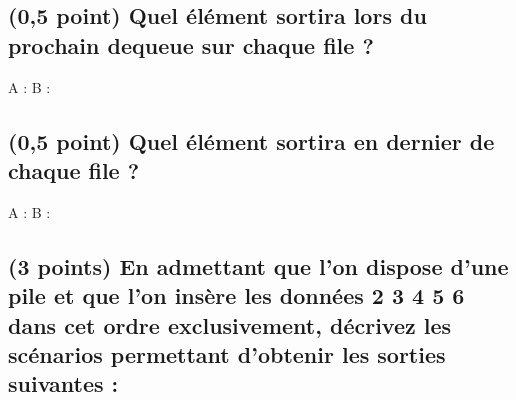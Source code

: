 \documentclass[11pt,a4paper]{article}
\begin{document}
\bigskip


\subsection{(0,5 point) Quel élément sortira lors du prochain \og dequeue \fg{} sur chaque file ? }

\bigskip
\bigskip

\begin{Large}
A :  \hspace{8cm}  B :
\end{Large}

\bigskip
\bigskip


\subsection{(0,5 point) Quel élément sortira en dernier de chaque file ? }

\bigskip
\bigskip

\begin{Large}
A :  \hspace{8cm}  B :
\end{Large}

\bigskip
\bigskip



\hspace{0pt}
\vfill

\newpage

\vfillFirst

\subsection{(3 points) En admettant que l'on dispose d'une pile et que l'on insère les données  2 3 4 5 6 \fg{} dans cet ordre exclusivement, décrivez les scénarios permettant d'obtenir les sorties suivantes : }
\end{document}

